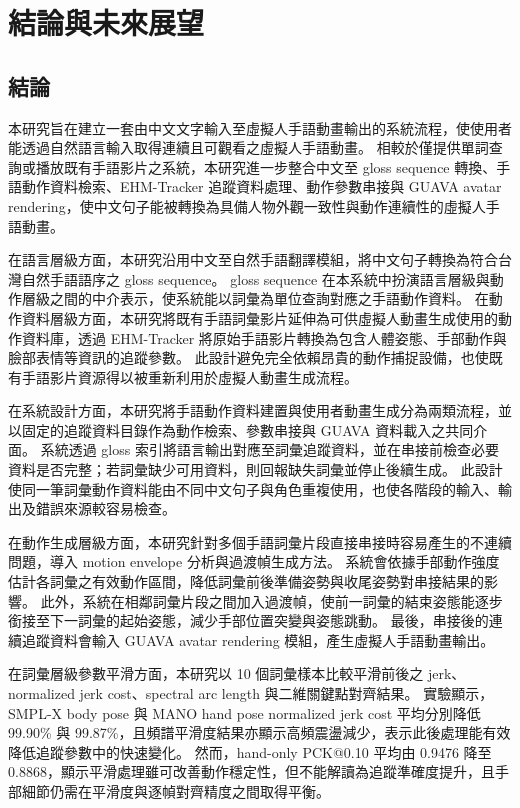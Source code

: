 \documentclass[class=NCU_thesis, crop=false]{standalone}
\begin{document}
\chapter{結論與未來展望}

\section{結論}

本研究旨在建立一套由中文文字輸入至虛擬人手語動畫輸出的系統流程，使使用者能透過自然語言輸入取得連續且可觀看之虛擬人手語動畫。
相較於僅提供單詞查詢或播放既有手語影片之系統，本研究進一步整合中文至 gloss sequence 轉換、手語動作資料檢索、EHM-Tracker 追蹤資料處理、動作參數串接與 GUAVA avatar rendering，使中文句子能被轉換為具備人物外觀一致性與動作連續性的虛擬人手語動畫。

在語言層級方面，本研究沿用中文至自然手語翻譯模組，將中文句子轉換為符合台灣自然手語語序之 gloss sequence。
gloss sequence 在本系統中扮演語言層級與動作層級之間的中介表示，使系統能以詞彙為單位查詢對應之手語動作資料。
在動作資料層級方面，本研究將既有手語詞彙影片延伸為可供虛擬人動畫生成使用的動作資料庫，透過 EHM-Tracker 將原始手語影片轉換為包含人體姿態、手部動作與臉部表情等資訊的追蹤參數。
此設計避免完全依賴昂貴的動作捕捉設備，也使既有手語影片資源得以被重新利用於虛擬人動畫生成流程。

在系統設計方面，本研究將手語動作資料建置與使用者動畫生成分為兩類流程，並以固定的追蹤資料目錄作為動作檢索、參數串接與 GUAVA 資料載入之共同介面。
系統透過 gloss 索引將語言輸出對應至詞彙追蹤資料，並在串接前檢查必要資料是否完整；若詞彙缺少可用資料，則回報缺失詞彙並停止後續生成。
此設計使同一筆詞彙動作資料能由不同中文句子與角色重複使用，也使各階段的輸入、輸出及錯誤來源較容易檢查。

在動作生成層級方面，本研究針對多個手語詞彙片段直接串接時容易產生的不連續問題，導入 motion envelope 分析與過渡幀生成方法。
系統會依據手部動作強度估計各詞彙之有效動作區間，降低詞彙前後準備姿勢與收尾姿勢對串接結果的影響。
此外，系統在相鄰詞彙片段之間加入過渡幀，使前一詞彙的結束姿態能逐步銜接至下一詞彙的起始姿態，減少手部位置突變與姿態跳動。
最後，串接後的連續追蹤資料會輸入 GUAVA avatar rendering 模組，產生虛擬人手語動畫輸出。

在詞彙層級參數平滑方面，本研究以 10 個詞彙樣本比較平滑前後之 jerk、normalized jerk cost、spectral arc length 與二維關鍵點對齊結果。
實驗顯示，SMPL-X body pose 與 MANO hand pose normalized jerk cost 平均分別降低 99.90\% 與 99.87\%，且頻譜平滑度結果亦顯示高頻震盪減少，表示此後處理能有效降低追蹤參數中的快速變化。
然而，hand-only PCK@0.10 平均由 0.9476 降至 0.8868，顯示平滑處理雖可改善動作穩定性，但不能解讀為追蹤準確度提升，且手部細節仍需在平滑度與逐幀對齊精度之間取得平衡。
\end{document}

